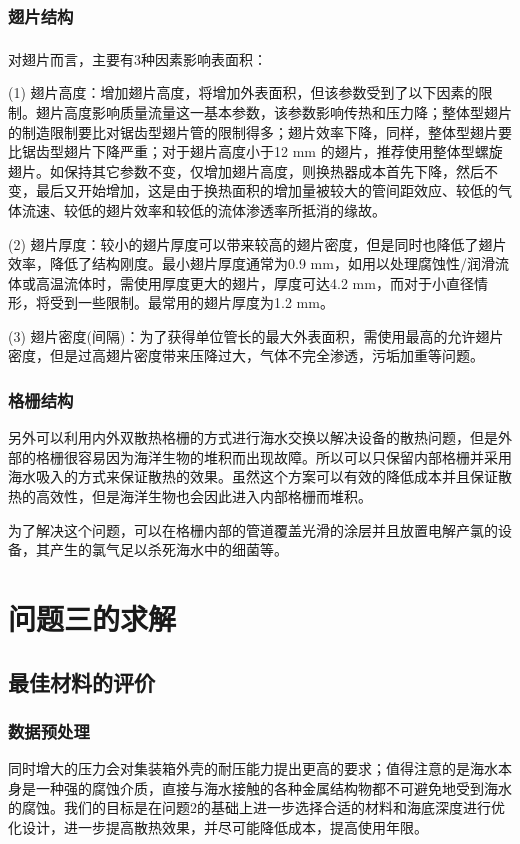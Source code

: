 \documentclass{article}
\newcommand{\upcite}[1]{\textsuperscript{\textsuperscript{\cite{#1}}}}
\begin{document}
   \subsubsection{翅片结构}
   对翅片而言，主要有3种因素\upcite{王任远2013散热器空气侧百叶窗翅片结构参数优化}影响表面积：
   
   (1) 翅片高度：增加翅片高度，将增加外表面积，但该参数受到了以下因素的限制。翅片高度影响质量流量这一基本参数，该参数影响传热和压力降；整体型翅片的制造限制要比对锯齿型翅片管的限制得多；翅片效率下降，同样，整体型翅片要比锯齿型翅片下降严重；对于翅片高度小于12 mm 的翅片，推荐使用整体型螺旋翅片。如保持其它参数不变，仅增加翅片高度，则换热器成本首先下降，然后不变，最后又开始增加，这是由于换热面积的增加量被较大的管间距效应、较低的气体流速、较低的翅片效率和较低的流体渗透率所抵消的缘故。
   
   (2) 翅片厚度：较小的翅片厚度可以带来较高的翅片密度，但是同时也降低了翅片效率，降低了结构刚度。最小翅片厚度通常为0.9 mm，如用以处理腐蚀性/润滑流体或高温流体时，需使用厚度更大的翅片，厚度可达4.2 mm，而对于小直径情形，将受到一些限制。最常用的翅片厚度为1.2 mm。
   
   (3) 翅片密度(间隔)：为了获得单位管长的最大外表面积，需使用最高的允许翅片密度，但是过高翅片密度带来压降过大，气体不完全渗透，污垢加重等问题。
   
	\subsubsection{格栅结构}
   另外可以利用内外双散热格栅的方式进行海水交换以解决设备的散热问题，但是外部的格栅很容易因为海洋生物的堆积而出现故障。所以可以只保留内部格栅并采用海水吸入的方式来保证散热的效果。虽然这个方案可以有效的降低成本并且保证散热的高效性，但是海洋生物也会因此进入内部格栅而堆积。
   
   为了解决这个问题，可以在格栅内部的管道覆盖光滑的涂层并且放置电解产氯的设备，其产生的氯气足以杀死海水中的细菌等。
   
   
   \section{问题三的求解}
   \subsection{最佳材料的评价}
   \subsubsection{数据预处理}
   同时增大的压力会对集装箱外壳的耐压能力提出更高的要求；值得注意的是海水本身是一种强的腐蚀介质，直接与海水接触的各种金属结构物都不可避免地受到海水的腐蚀。我们的目标是在问题2的基础上进一步选择合适的材料和海底深度进行优化设计，进一步提高散热效果，并尽可能降低成本，提高使用年限。
   
\end{document}
